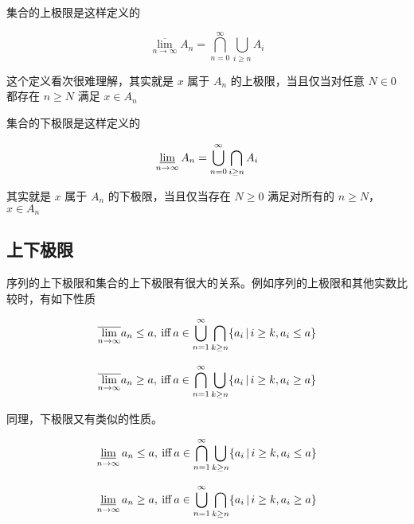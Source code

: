 集合的上极限是这样定义的

\[
\overline{\lim_{n \to \infty}}A_n  = \bigcap_{n=0}^{\infty}\bigcup_{i \ge n}A_i
\]

这个定义看次很难理解，其实就是 $x$ 属于 $A_n$ 的上极限，当且仅当对任意 $N \in 0$ 都存在 $n \ge N$ 满足 $x \in A_n$


集合的下极限是这样定义的

\[
\varliminf_{n \to \infty}A_n  = \bigcup_{n=0}^{\infty}\bigcap_{i \ge n}A_i
\]

其实就是 $x$ 属于 $A_n$ 的下极限，当且仅当存在 $N  \ge 0$ 满足对所有的 $n \ge N$，$x \in A_n$

\subsection{上下极限}

序列的上下极限和集合的上下极限有很大的关系。例如序列的上极限和其他实数比较时，有如下性质

\[
\overline{\lim_{n \to \infty}} a_n \le a ,\:\text{iff}\: a \in \bigcup_{n=1}^{\infty} \bigcap_{k \ge n} \{ a_i \,\vert\, i \ge k, a_i \le a \} 
\]


\[
\overline{\lim_{n \to \infty}} a_n \ge a ,\:\text{iff}\: a \in \bigcap_{n=1}^{\infty} \bigcup_{k \ge n} \{ a_i \,\vert\, i \ge k, a_i \ge a \} 
\]

同理，下极限又有类似的性质。

\[
\varliminf_{n \to \infty} a_n \le a ,\:\text{iff}\: a \in \bigcap_{n=1}^{\infty} \bigcup_{k \ge n} \{ a_i \,\vert\, i \ge k, a_i \le a \} 
\]


\[
\varliminf_{n \to \infty} a_n \ge a ,\:\text{iff}\: a \in \bigcup_{n=1}^{\infty} \bigcap_{k \ge n} \{ a_i \,\vert\, i \ge k, a_i \ge a \} 
\]


